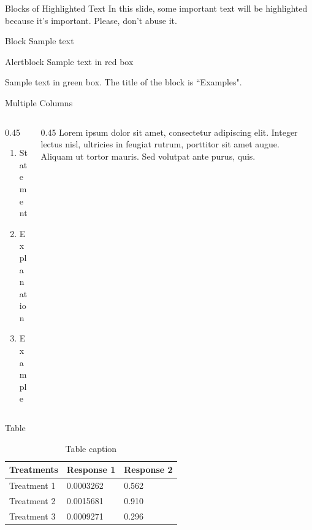 \documentclass[aspectratio=169,xcolor=dvipsnames, t]{beamer} %
\begin{document}
\begin{frame}{Blocks of Highlighted Text}
    In this slide, some important text will be \alert{highlighted} because it's important. Please, don't abuse it.

    \begin{block}{Block}
        Sample text
    \end{block}

    \begin{alertblock}{Alertblock}
        Sample text in red box
    \end{alertblock}

    \begin{examples}
        Sample text in green box. The title of the block is ``Examples".
    \end{examples}
\end{frame}

\begin{frame}{Multiple Columns}
    \begin{columns}
    \begin{column}{0.45\textwidth}
        \begin{enumerate}
            \item Statement
            \item Explanation
            \item Example
        \end{enumerate}
    \end{column}
    \begin{column}{0.45\textwidth}  %
        Lorem ipsum dolor sit amet, consectetur adipiscing elit. Integer lectus nisl, ultricies in feugiat rutrum, porttitor sit amet augue. Aliquam ut tortor mauris. Sed volutpat ante purus, quis.
    \end{column}
    \end{columns}
\end{frame}

\begin{frame}{Table}
    \begin{table}
        \caption{Table caption}
        \label{Table:Table_Name}
        \begin{tabular}{l l l}
            \toprule
            \textbf{Treatments} & \textbf{Response 1} & \textbf{Response 2} \\
            \midrule
            Treatment 1         & 0.0003262           & 0.562               \\
            Treatment 2         & 0.0015681           & 0.910               \\
            Treatment 3         & 0.0009271           & 0.296               \\
            \bottomrule
        \end{tabular}
    \end{table}
\end{frame}
\end{document}
